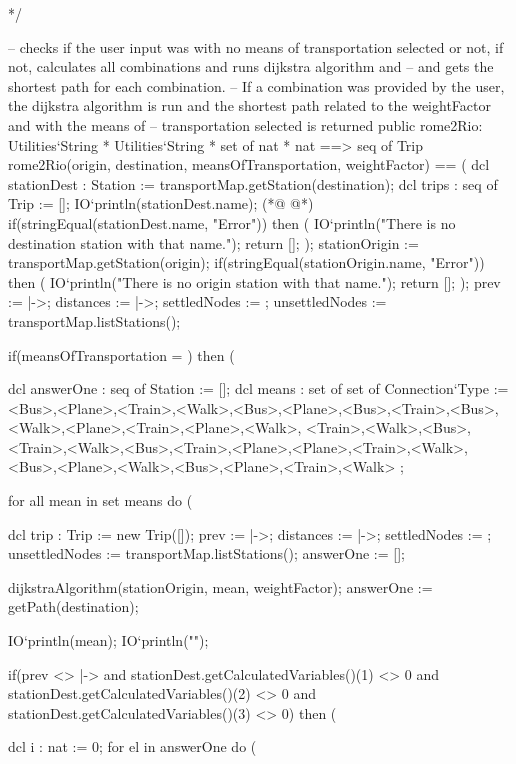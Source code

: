 \begin{vdmpp}[breaklines=true]
 */
 
 -- checks if the user input was with no means of transportation selected or not, if not, calculates all combinations and runs dijkstra algorithm and
 -- and gets the shortest path for each combination.
 -- If a combination was provided by the user, the dijkstra algorithm is run and the shortest path related to the weightFactor and with the means of 
 -- transportation selected is returned
 public rome2Rio: Utilities`String * Utilities`String * set of nat * nat ==> seq of Trip 
 rome2Rio(origin, destination, meansOfTransportation, weightFactor) ==
 (
  dcl stationDest : Station := transportMap.getStation(destination);
  dcl trips : seq of Trip := [];
  IO`println(stationDest.name);
(*@
\label{rome2Rio:350}
@*)
  if(stringEqual(stationDest.name, "Error")) then (
    IO`println("There is no destination station with that name.");
    return [];
  );
  stationOrigin := transportMap.getStation(origin);
  if(stringEqual(stationOrigin.name, "Error")) then (
    IO`println("There is no origin station with that name.");
    return [];
  );
  prev := {|->};
  distances := {|->};
  settledNodes := {};
  unsettledNodes := transportMap.listStations();
  
  if(meansOfTransportation = {}) then (
   
   dcl answerOne : seq of Station := [];
   dcl means : set of set of Connection`Type := {
    {<Bus>},{<Plane>},{<Train>},{<Walk>},{<Bus>,<Plane>},{<Bus>,<Train>},{<Bus>,<Walk>},{<Plane>,<Train>},{<Plane>,<Walk>},
    {<Train>,<Walk>},{<Bus>,<Train>,<Walk>},{<Bus>,<Train>,<Plane>},{<Plane>,<Train>,<Walk>},{<Bus>,<Plane>,<Walk>},{<Bus>,<Plane>,<Train>,<Walk>}
   };
   
   for all mean in set means do (
    
    dcl trip : Trip := new Trip([]);
    prev := {|->};
    distances := {|->};
    settledNodes := {};
    unsettledNodes := transportMap.listStations();
    answerOne := [];
    
    
    dijkstraAlgorithm(stationOrigin, mean, weightFactor);
    answerOne := getPath(destination);
    
    IO`println(mean);
    IO`println("\n\n");
    
    if(prev <> {|->} and stationDest.getCalculatedVariables()(1) <> 0 
     and stationDest.getCalculatedVariables()(2) <> 0 and stationDest.getCalculatedVariables()(3) <> 0) then (
    
     dcl i : nat := 0;
     for el in answerOne do (
     

\end{vdmpp}
